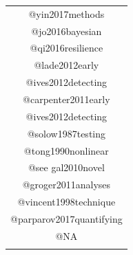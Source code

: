 \documentclass[12pt,twoside,openany]{reedthesis}
\begin{document}
\begin{longtable}[]{@{}c@{}}
\begin{minipage}[t]{0.46\columnwidth}\centering
@yin2017methods\strut
\end{minipage}\tabularnewline
\begin{minipage}[t]{0.46\columnwidth}\centering
@jo2016bayesian\strut
\end{minipage}\tabularnewline
\begin{minipage}[t]{0.46\columnwidth}\centering
@qi2016resilience\strut
\end{minipage}\tabularnewline
\begin{minipage}[t]{0.46\columnwidth}\centering
@lade2012early\strut
\end{minipage}\tabularnewline
\begin{minipage}[t]{0.46\columnwidth}\centering
@ives2012detecting\strut
\end{minipage}\tabularnewline
\begin{minipage}[t]{0.46\columnwidth}\centering
@carpenter2011early\strut
\end{minipage}\tabularnewline
\begin{minipage}[t]{0.46\columnwidth}\centering
@ives2012detecting\strut
\end{minipage}\tabularnewline
\begin{minipage}[t]{0.46\columnwidth}\centering
@solow1987testing\strut
\end{minipage}\tabularnewline
\begin{minipage}[t]{0.46\columnwidth}\centering
@tong1990nonlinear\strut
\end{minipage}\tabularnewline
\begin{minipage}[t]{0.46\columnwidth}\centering
@see
gal2010novel\strut
\end{minipage}\tabularnewline
\begin{minipage}[t]{0.46\columnwidth}\centering
@groger2011analyses\strut
\end{minipage}\tabularnewline
\begin{minipage}[t]{0.46\columnwidth}\centering
@vincent1998technique\strut
\end{minipage}\tabularnewline
\begin{minipage}[t]{0.46\columnwidth}\centering
@parparov2017quantifying\strut
\end{minipage}\tabularnewline
\begin{minipage}[t]{0.46\columnwidth}\centering
@NA\strut
\end{minipage}\tabularnewline
\begin{minipage}[t]{0.46\columnwidth}\centering

\end{minipage}
\end{longtable}
\end{document}
